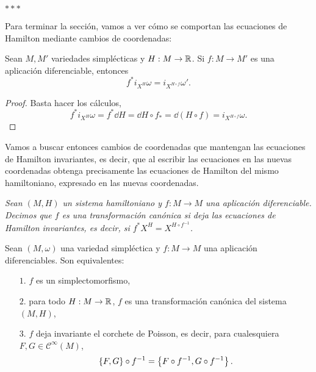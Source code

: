   \begin{center}  $\ast\ast\ast$ \end{center}

  Para terminar la sección, vamos a ver cómo se comportan las ecuaciones de Hamilton mediante cambios de coordenadas:
\begin{prop}
 Sean $M,M'$ variedades simplécticas y $H:M\rightarrow \mathbb{R}$. Si $f:M\rightarrow M'$ es una aplicación diferenciable, entonces 
 \begin{equation*}
   f^*i_{X^H}\omega=i_{X^{H\circ f}}\omega'.
 \end{equation*}
\end{prop}
\begin{proof}
  Basta hacer los cálculos,
  \begin{equation*}
    f^*i_{X^H}\omega=f^*\dd H=\dd H \circ f_* = \dd (H\circ f)=i_{X^{H\circ f}}\omega.
  \end{equation*}
\end{proof}
Vamos a buscar entonces cambios de coordenadas que mantengan las ecuaciones de Hamilton invariantes, es decir, que al escribir las ecuaciones en las nuevas coordenadas obtenga precisamente las ecuaciones de Hamilton del mismo hamiltoniano, expresado en las nuevas coordenadas.
\begin{defn}
  \em
  Sean $(M,H)$ un sistema hamiltoniano y $f:M\rightarrow M$ una aplicación diferenciable. Decimos que $f$ es una \emph{transformación canónica} si deja las ecuaciones de Hamilton invariantes, es decir, si $f^*X^H=X^{H\circ f^{-1}}$.
\end{defn}

\begin{prop}
  Sean $(M,\omega)$ una variedad simpléctica y $f:M\rightarrow M$ una aplicación diferenciables. Son equivalentes:
  \begin{enumerate}
    \item[$1$.] $f$ es un simplectomorfismo,
    \item[$2$.] para todo $H:M\rightarrow \mathbb{R}$, $f$ es una transformación canónica del sistema $(M,H)$,
    \item[$3$.] $f$ deja invariante el corchete de Poisson, es decir, para cualesquiera $F,G\in \mathcal{C}^{\infty}(M)$, 
      \begin{equation*}
	\left\lbrace F,G\right\rbrace\circ f^{-1}=\left\lbrace F\circ f^{-1},G\circ f^{-1}\right\rbrace.
      \end{equation*}
  \end{enumerate}
\end{prop}

